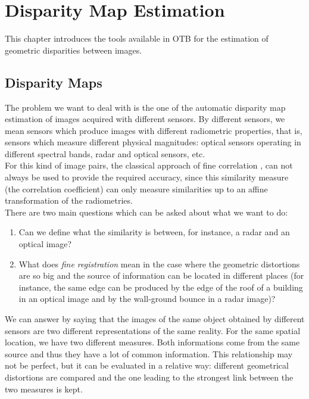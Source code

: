 \chapter{Disparity Map Estimation}
\label{sec:DisparityMapEstimation}

This chapter introduces the tools available in OTB for the estimation
of geometric disparities between images.


\section{Disparity Maps}
\ifitkFullVersion
\label{sec:DisparityMaps}
\fi

The problem we want to deal with is the one of the
automatic disparity map estimation of images acquired with different sensors. By different
sensors, we mean sensors which produce images with different
radiometric properties, that is, sensors which measure different
physical magnitudes: optical sensors operating in different spectral
bands, radar and optical sensors, etc.\\

For this kind of image pairs, the classical approach of fine
correlation \cite{correl1,correl2}, can not always be used to
provide the required accuracy, since this similarity measure (the correlation
coefficient) can only measure similarities up to an affine
transformation of the radiometries.\\

There are two main questions which can be asked about what we want to
do:
\begin{enumerate}
\item Can we define what the similarity is between, for instance, a radar
and an optical image?
\item What does {\em fine registration} mean in the case where the
geometric distortions are so big and the source of information can be
located in different places (for instance, the same edge can be
produced by the edge of the roof of a building in an optical image and
by the wall-ground bounce in a radar image)?
\end{enumerate}

We can answer by saying that the images of the same object obtained by different
sensors are two different representations of the same reality. For the
same spatial location, we have two different measures. Both informations
come from the same source and thus they have a lot of common
information. This relationship may not be perfect, but it can be
evaluated in a relative way: different geometrical distortions are
compared and the one leading to the strongest link between the two
measures is kept.\\

